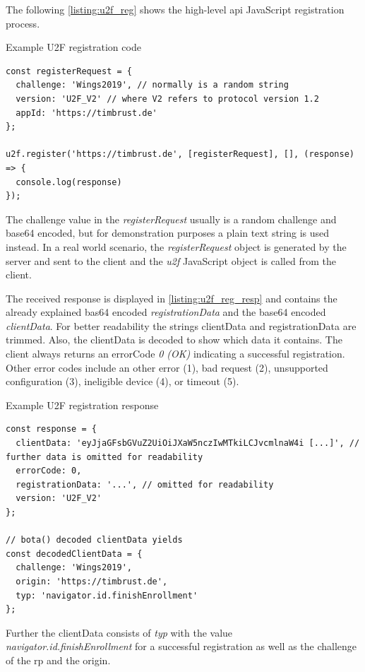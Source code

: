 The following \autoref{listing:u2f_reg} shows the high-level \gls{api} JavaScript registration process.
\\
\begin{example}{Example U2F registration code}
\begin{verbatim}
const registerRequest = {
  challenge: 'Wings2019', // normally is a random string
  version: 'U2F_V2' // where V2 refers to protocol version 1.2
  appId: 'https://timbrust.de'
};

u2f.register('https://timbrust.de', [registerRequest], [], (response) => {
  console.log(response)
});
\end{verbatim}
\label{listing:u2f_reg}
\end{example}

The challenge value in the \textit{registerRequest} usually is a random challenge and base64 encoded, but for demonstration purposes a plain text string is used instead. In a real world scenario, the \textit{registerRequest} object is generated by the server and sent to the client and the \textit{u2f} JavaScript object is called from the client.

The received response is displayed in \autoref{listing:u2f_reg_resp} and contains the already explained bas64 encoded \textit{registrationData} and the base64 encoded \textit{clientData}. For better readability the strings clientData and registrationData are trimmed. Also, the clientData is decoded to show which data it contains. The client always returns an errorCode \textit{0 (OK)} indicating a successful registration. Other error codes include an other error (1), bad request (2), unsupported configuration (3), ineligible device (4), or timeout (5).

\begin{example}{Example U2F registration response}
\begin{verbatim}
const response = {
  clientData: 'eyJjaGFsbGVuZ2UiOiJXaW5nczIwMTkiLCJvcmlnaW4i [...]', // further data is omitted for readability
  errorCode: 0,
  registrationData: '...', // omitted for readability
  version: 'U2F_V2'
};

// bota() decoded clientData yields
const decodedClientData = {
  challenge: 'Wings2019',
  origin: 'https://timbrust.de',
  typ: 'navigator.id.finishEnrollment'
};
\end{verbatim}
\label{listing:u2f_reg_resp}
\end{example}

Further the clientData consists of \textit{typ} with the value \textit{navigator.id.finishEnrollment} for a successful registration as well as the challenge of the \gls{rp} and the origin.

